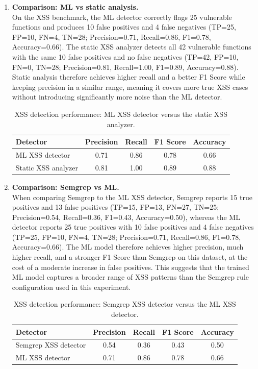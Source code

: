 \begin{enumerate}
  \item \textbf{Comparison: ML vs static analysis.}\\
  On the XSS benchmark, the ML detector correctly flags 25 vulnerable functions and
  produces 10 false positives and 4 false negatives (TP=25, FP=10, FN=4, TN=28;
  Precision=0.71, Recall=0.86, F1=0.78, Accuracy=0.66). The static XSS analyzer detects
  all 42 vulnerable functions with the same 10 false positives and no false negatives
  (TP=42, FP=10, FN=0, TN=28; Precision=0.81, Recall=1.00, F1=0.89, Accuracy=0.88).
  Static analysis therefore achieves higher recall and a better F1 Score while keeping
  precision in a similar range, meaning it covers more true XSS cases without introducing
  significantly more noise than the ML detector.

  \begin{table}[htbp]
    \centering
    \small
    \begin{tabular}{lcccc}
      \textbf{Detector} & \textbf{Precision} & \textbf{Recall} & \textbf{F1 Score} & \textbf{Accuracy} \\
      \hline
      ML XSS detector & 0.71 & 0.86 & 0.78 & 0.66 \\
      Static XSS analyzer & 0.81 & 1.00 & 0.89 & 0.88 \\
    \end{tabular}
    \caption{XSS detection performance: ML XSS detector versus the static XSS analyzer.}
    \label{tab:xss_ml_vs_static}
  \end{table}

  \item \textbf{Comparison: Semgrep vs ML.}\\
  When comparing Semgrep to the ML XSS detector, Semgrep reports 15 true positives and
  13 false positives (TP=15, FP=13, FN=27, TN=25; Precision=0.54, Recall=0.36, F1=0.43,
  Accuracy=0.50), whereas the ML detector reports 25 true positives with 10 false positives
  and 4 false negatives (TP=25, FP=10, FN=4, TN=28; Precision=0.71, Recall=0.86,
  F1=0.78, Accuracy=0.66). The ML model therefore achieves higher precision, much higher
  recall, and a stronger F1 Score than Semgrep on this dataset, at the cost of a moderate
  increase in false positives. This suggests that the trained ML model captures a broader
  range of XSS patterns than the Semgrep rule configuration used in this experiment.

  \begin{table}[htbp]
    \centering
    \small
    \begin{tabular}{lcccc}
      \textbf{Detector} & \textbf{Precision} & \textbf{Recall} & \textbf{F1 Score} & \textbf{Accuracy} \\
      \hline
      Semgrep XSS detector & 0.54 & 0.36 & 0.43 & 0.50 \\
      ML XSS detector & 0.71 & 0.86 & 0.78 & 0.66 \\
    \end{tabular}
    \caption{XSS detection performance: Semgrep XSS detector versus the ML XSS detector.}
    \label{tab:xss_semgrep_vs_ml}
  \end{table}


\end{enumerate}
